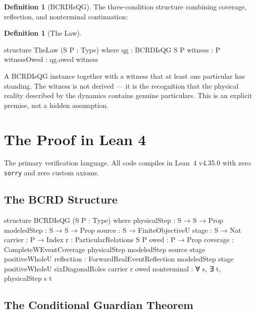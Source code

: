 \documentclass[11pt,a4paper]{article}
\theoremstyle{definition}
\newtheorem{definition}[theorem]{Definition}
\theoremstyle{remark}
\begin{document}
\begin{definition}[BCRDIsQG]\label{def:bcrd}
The three-condition structure combining coverage, reflection, and nonterminal continuation:
\end{definition}

\begin{definition}[The Law]\label{def:thelaw}
\begin{leancode}
structure TheLaw (S P : Type) where
  qg          : BCRDIsQG S P
  witness     : P
  witnessOwed : qg.owed witness
\end{leancode}
A BCRDIsQG instance together with a witness that at least one particular has standing. The witness is not derived --- it is the recognition that the physical reality described by the dynamics contains genuine particulars. This is an explicit premise, not a hidden assumption.
\end{definition}

\section{The Proof in Lean 4}\label{sec:lean}

The primary verification language. All code compiles in Lean~4 v4.35.0 with zero \texttt{sorry} and zero custom axioms.

\subsection{The BCRD Structure}

\begin{leancode}
structure BCRDIsQG (S P : Type) where
  physicalStep : S → S → Prop
  modeledStep  : S → S → Prop
  source       : S → FiniteObjectiveU
  stage        : S → Nat
  carrier      : P → Index
  r            : ParticularRelations S P
  owed         : P → Prop
  coverage     : CompleteWEventCoverage physicalStep modeledStep
                   source stage positiveWholeU
  reflection   : ForwardRealEventReflection modeledStep stage
                   positiveWholeU sixDiagonalRoles carrier r owed
  nonterminal  : ∀ s, ∃ t, physicalStep s t
\end{leancode}

\subsection{The Conditional Guardian Theorem}
\end{document}
